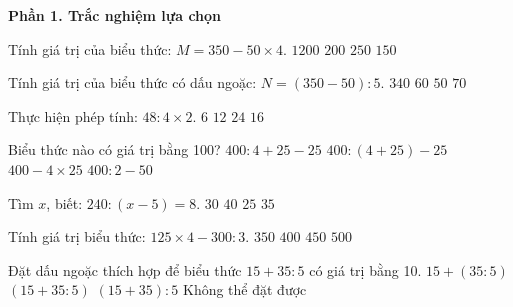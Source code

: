 \textbf{Phần 1. Trắc nghiệm lựa chọn}

\begin{ex} %
Tính giá trị của biểu thức: $M = 350 - 50 \times 4$.
\choice
{$1200$}
{$200$}
{$250$}
{\True $150$}
\end{ex}

\begin{ex} %
Tính giá trị của biểu thức có dấu ngoặc: $N = (350 - 50) : 5$.
\choice
{$340$}
{\True $60$}
{$50$}
{$70$}
\end{ex}

\begin{ex} %
Thực hiện phép tính: $48 : 4 \times 2$.
\choice
{$6$}
{$12$}
{\True $24$}
{$16$}
\end{ex}

\begin{ex} %
Biểu thức nào có giá trị bằng 100?
\choice
{\True $400 : 4 + 25 - 25$}
{$400 : (4 + 25) - 25$}
{$400 - 4 \times 25$}
{$400 : 2 - 50$}
\end{ex}

\begin{ex} %
Tìm $x$, biết: $240 : (x - 5) = 8$.
\choice
{$30$}
{$40$}
{$25$}
{\True $35$}
\end{ex}

\begin{ex} %
Tính giá trị biểu thức: $125 \times 4 - 300 : 3$.
\choice
{$350$}
{\True $400$}
{$450$}
{$500$}
\end{ex}

\begin{ex} %
Đặt dấu ngoặc thích hợp để biểu thức $15 + 35 : 5$ có giá trị bằng 10.
\choice
{$15 + (35 : 5)$}
{$(15 + 35 : 5)$}
{\True $(15 + 35) : 5$}
{Không thể đặt được}
\end{ex}

